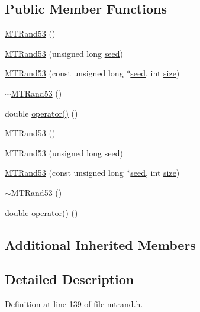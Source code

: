 \subsection*{Public Member Functions}
\begin{DoxyCompactItemize}
\item 
\hyperlink{a00016_a24711c9e6e5ee72715f34515d1f1939a}{M\+T\+Rand53} ()
\item 
\hyperlink{a00016_ad800887e15d4095f22facdb67f270c5e}{M\+T\+Rand53} (unsigned long \hyperlink{a00018_a0c57076fe30358e0700a7ce1baa0ea27}{seed})
\item 
\hyperlink{a00016_ac77b190d3ac27adea2d2c6c2ce2347c3}{M\+T\+Rand53} (const unsigned long $\ast$\hyperlink{a00018_a0c57076fe30358e0700a7ce1baa0ea27}{seed}, int \hyperlink{a00104_ae113ea7f9e515a12ac4b5595c6faf61e}{size})
\item 
\hyperlink{a00016_a947a6a7afd0c8a17612cda3faa705a75}{$\sim$\+M\+T\+Rand53} ()
\item 
double \hyperlink{a00016_ab6657cb5349f39bc4553d3a970458b45}{operator()} ()
\item 
\hyperlink{a00016_a24711c9e6e5ee72715f34515d1f1939a}{M\+T\+Rand53} ()
\item 
\hyperlink{a00016_ad800887e15d4095f22facdb67f270c5e}{M\+T\+Rand53} (unsigned long \hyperlink{a00018_a0c57076fe30358e0700a7ce1baa0ea27}{seed})
\item 
\hyperlink{a00016_ac77b190d3ac27adea2d2c6c2ce2347c3}{M\+T\+Rand53} (const unsigned long $\ast$\hyperlink{a00018_a0c57076fe30358e0700a7ce1baa0ea27}{seed}, int \hyperlink{a00104_ae113ea7f9e515a12ac4b5595c6faf61e}{size})
\item 
\hyperlink{a00016_a947a6a7afd0c8a17612cda3faa705a75}{$\sim$\+M\+T\+Rand53} ()
\item 
double \hyperlink{a00016_ab6657cb5349f39bc4553d3a970458b45}{operator()} ()
\end{DoxyCompactItemize}
\subsection*{Additional Inherited Members}


\subsection{Detailed Description}


Definition at line 139 of file mtrand.\+h.



